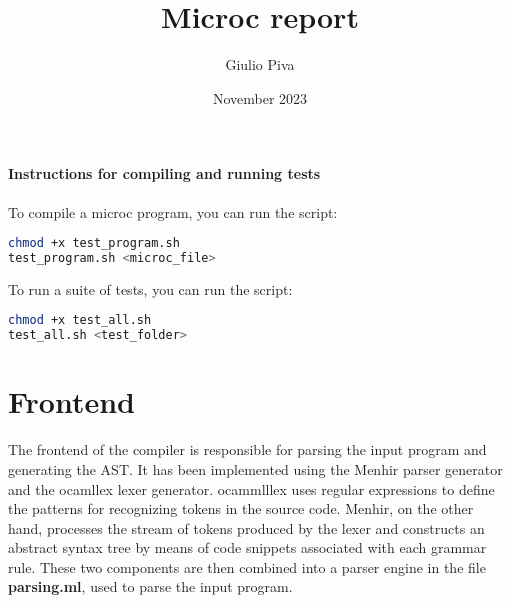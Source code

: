 \documentclass{article}
\title{Microc report}
\author{Giulio Piva}
\date{November 2023}
\begin{document}
\maketitle

\paragraph{Instructions for compiling and running tests}
To compile a microc program, you can run the script:

\begin{lstlisting}[frame=single,language=bash, basicstyle=\ttfamily\fontsize{8pt}{14pt}]
chmod +x test_program.sh
test_program.sh <microc_file>
\end{lstlisting}
To run a suite of tests, you can run the script:
\begin{lstlisting}[frame=single, language=bash, basicstyle=\ttfamily\fontsize{8pt}{14pt}]
chmod +x test_all.sh
test_all.sh <test_folder>
\end{lstlisting}

\section{Frontend}
The frontend of the compiler is responsible for parsing the input program and generating the AST.
It has been implemented using the Menhir parser generator and the ocamllex lexer generator.
ocammlllex uses regular expressions to define the patterns for recognizing tokens in the source code.
Menhir, on the other hand, processes the stream of tokens produced by the lexer and
constructs an abstract syntax tree by means of code snippets associated with each grammar rule.
These two components are then combined into a parser engine in the file \textbf{parsing.ml}, used to parse the input program.
\end{document}
